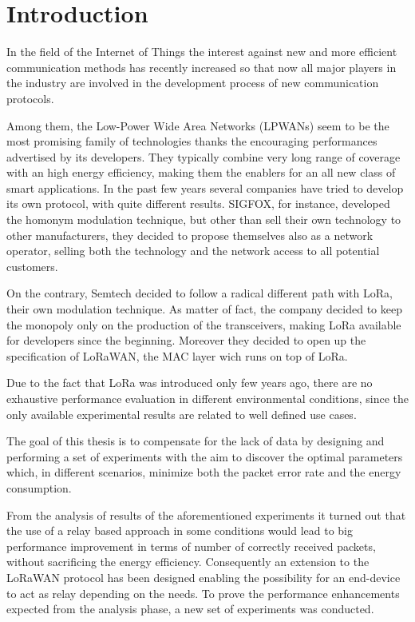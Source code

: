 \chapter{Introduction}

In the field of the Internet of Things the interest against new and more efficient communication methods has recently increased so that now all major players in the industry are involved in the development process of new communication protocols.

Among them, the Low-Power Wide Area Networks (LPWANs) seem to be the most promising family of technologies thanks the encouraging performances advertised by its developers. They typically combine very long range of coverage with an high energy efficiency, making them the enablers for an all new class of smart applications. In the past few years several companies have tried to develop its own protocol, with quite different results. SIGFOX, for instance, developed the homonym modulation technique, but other than sell their own technology to other manufacturers, they decided to propose themselves also as a network operator, selling both the technology and the network access to all potential customers.

On the contrary, Semtech decided to follow a radical different path with LoRa, their own modulation technique. As matter of fact, the company decided to keep the monopoly only on the production of the transceivers, making LoRa available for developers since the beginning. Moreover they decided to open up the specification of LoRaWAN, the MAC layer wich runs on top of LoRa.

Due to the fact that LoRa was introduced only few years ago, there are no exhaustive performance evaluation in different environmental conditions, since the only available experimental results are related to well defined use cases.

The goal of this thesis is to compensate for the lack of data by designing and performing a set of experiments with the aim to discover the optimal parameters which, in different scenarios, minimize both the packet error rate and the energy consumption.

From the analysis of results of the aforementioned experiments it turned out that the use of a relay based approach in some conditions would lead to big performance improvement in terms of number of correctly received packets, without sacrificing the energy efficiency. Consequently an extension to the LoRaWAN protocol has been designed enabling the possibility for an end-device to act as relay depending on the needs. To prove the performance enhancements expected from the analysis phase, a new set of experiments was conducted. 

